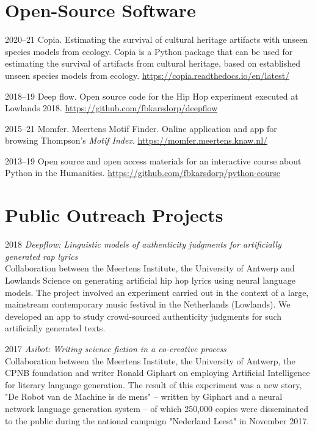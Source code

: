 \documentclass[12pt,letterpaper]{report}
\begin{document}
\section*{Open-Source Software}
\begin{tablist}
  \item[2020--21] \tab{}Copia. Estimating the survival of cultural heritage artifacts with
    unseen species models from ecology. Copia is a Python package that can be used for
    estimating the survival of artifacts from cultural heritage, based on established
    unseen species models from ecology. \url{https://copia.readthedocs.io/en/latest/}
  \item[2018--19] \tab{}Deep flow. Open source code for the Hip Hop experiment executed at
    Lowlands 2018. \url{https://github.com/fbkarsdorp/deepflow}
  \item[2015--21] \tab{}Momfer. Meertens Motif Finder. Online application and app for
    browsing Thompson's \textit{Motif Index}. \url{https://momfer.meertens.knaw.nl/}
  \item[2013--19] \tab{}Open source and open access materials for an interactive course
    about Python in the Humanities. \url{https://github.com/fbkarsdorp/python-course}
\end{tablist}

\section*{Public Outreach Projects}
\begin{tablist}
\item[2018] \tab{}\textit{Deepflow: Linguistic models of authenticity judgments
    for artificially generated rap lyrics}\\
  Collaboration between the Meertens Institute, the University of Antwerp and
  Lowlands Science on generating artificial hip hop lyrics using neural language
  models. The project involved an experiment carried out in the context of a
  large, mainstream contemporary music festival in the Netherlands (Lowlands).
  We developed an app to study crowd-sourced authenticity judgments for such
  artificially generated texts.
\item[2017] \tab{}\textit{Asibot: Writing science fiction in a co-creative process}\\
  Collaboration between the Meertens Institute, the University of Antwerp, the
  CPNB foundation and writer Ronald Giphart on employing Artificial Intelligence
  for literary language generation. The result of this experiment was a new
  story, "De Robot van de Machine is de mens" – written by Giphart and a neural
  network language generation system – of which 250,000 copies were disseminated
  to the public during the national campaign "Nederland Leest" in November 2017.
\end{tablist}
\end{document}
